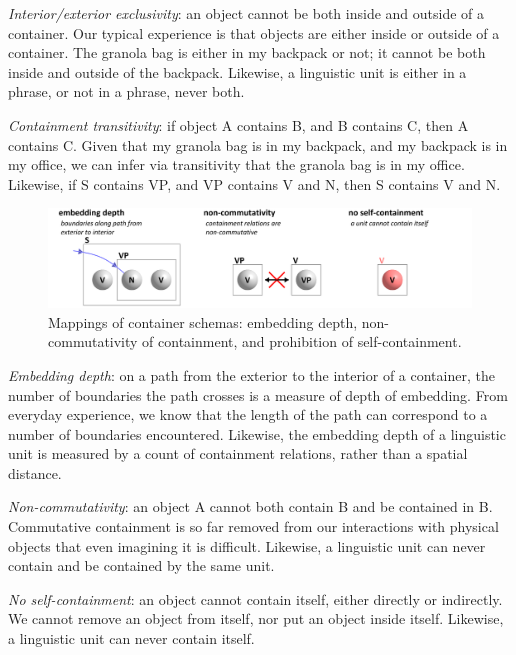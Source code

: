 \textit{Interior/exterior exclusivity}: an object cannot be both inside and outside of a container. Our typical experience is that objects are either inside or outside of a container. The granola bag is either in my backpack or not; it cannot be both inside and outside of the backpack. Likewise, a linguistic unit is either in a phrase, or not in a phrase, never both.

\textit{Containment transitivity}: if object A contains B, and B contains C, then A contains C. Given that my granola bag is in my backpack, and my backpack is in my office, we can infer via transitivity that the granola bag is in my office. Likewise, if S contains VP, and VP contains V and N, then S contains V and N.

  
\begin{figure}
\includegraphics[width=\textwidth]{figures/Tilsen-img33.png}
\caption{Mappings of container schemas: embedding depth, non-commutativity of containment, and prohibition of self-containment.}
\label{fig:3:5}
\end{figure}
 

\textit{Embedding depth}: on a path from the exterior to the interior of a container, the number of boundaries the path crosses is a measure of depth of embedding. From everyday experience, we know that the length of the path can correspond to a number of boundaries encountered. Likewise, the embedding depth of a linguistic unit is measured by a count of containment relations, rather than a spatial distance.

\textit{Non-commutativity}: an object A cannot both contain B and be contained in B. Commutative containment is so far removed from our interactions with physical objects that even imagining it is difficult. Likewise, a linguistic unit can never contain and be contained by the same unit.

\textit{No self-containment}: an object cannot contain itself, either directly or indirectly. We cannot remove an object from itself, nor put an object inside itself. Likewise, a linguistic unit can never contain itself. 

